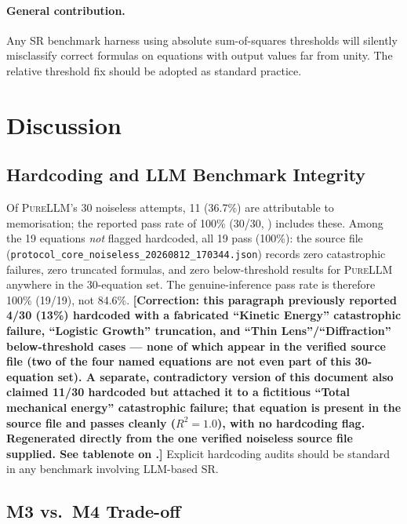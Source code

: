 \documentclass[twoside,11pt]{article}
\newcommand{\PureLLM}{\textsc{PureLLM}}
\newcommand{\Rsq}{R^{2}}
\begin{document}
\paragraph{General contribution.}
Any SR benchmark harness using absolute sum-of-squares thresholds will
silently misclassify correct formulas on equations with output values far
from unity.  The relative threshold fix should be adopted as standard practice.

\section{Discussion}
\label{suppb:discussion}

\subsection{Hardcoding and LLM Benchmark Integrity}

Of \PureLLM{}'s 30 noiseless attempts, 11 (36.7\%) are attributable to
memorisation; the reported pass rate of 100\% (30/30, )
includes these. Among the 19 equations \emph{not} flagged hardcoded, all
19 pass (100\%): the source file
(\texttt{protocol\_core\_noiseless\_20260812\_170344.json}) records zero
catastrophic failures, zero truncated formulas, and zero below-threshold
results for \PureLLM{} anywhere in the 30-equation set. The
genuine-inference pass rate is therefore 100\% (19/19), not 84.6\%.
\textbf{[Correction: this paragraph previously reported 4/30 (13\%)
hardcoded with a fabricated ``Kinetic Energy'' catastrophic failure,
``Logistic Growth'' truncation, and ``Thin Lens''/``Diffraction''
below-threshold cases --- none of which appear in the verified source
file (two of the four named equations are not even part of this
30-equation set). A separate, contradictory version of this document
also claimed 11/30 hardcoded but attached it to a fictitious ``Total
mechanical energy'' catastrophic failure; that equation is present in
the source file and passes cleanly ($\Rsq=1.0$), with no hardcoding
flag. Regenerated directly from the one verified noiseless source file
supplied. See tablenote on .]}
Explicit hardcoding audits should be standard in any
benchmark involving LLM-based SR.

\subsection{M3 vs.\ M4 Trade-off}
\end{document}
